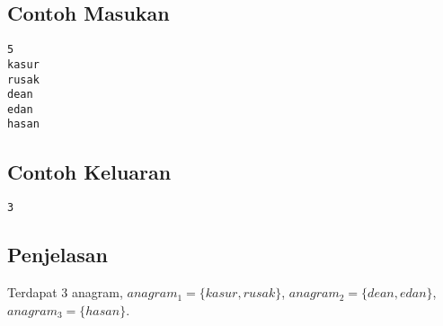 \documentclass{article}
\begin{document}
\begin{multicols}{2}
\subsection*{Contoh Masukan}
\begin{lstlisting}
5
kasur
rusak
dean
edan
hasan

\end{lstlisting}
\columnbreak
\subsection*{Contoh Keluaran}
\begin{lstlisting}
3
\end{lstlisting}
\vfill
\null
\end{multicols}

\subsection*{Penjelasan}

Terdapat 3 anagram, $anagram_1 = \{kasur, rusak\}$, $anagram_2 = \{dean, edan\}$, $anagram_3 = \{hasan\}$.
\end{document}
